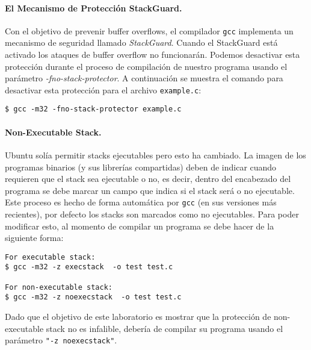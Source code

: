 \paragraph{El Mecanismo de Protección StackGuard.}
Con el objetivo de prevenir buffer overflows, el compilador \texttt{gcc} implementa un mecanismo de seguridad llamado \textit{StackGuard}. Cuando el StackGuard está activado los ataques de buffer overflow no funcionarán. Podemos desactivar esta protección durante el proceso de compilación de nuestro programa usando el parámetro \emph{-fno-stack-protector}.
A continuación se muestra el comando para desactivar esta protección para el archivo \texttt{example.c}:

\begin{lstlisting}
$ gcc -m32 -fno-stack-protector example.c
\end{lstlisting}


\paragraph{Non-Executable Stack.} Ubuntu solía permitir stacks ejecutables pero esto ha cambiado. La imagen de los programas binarios (y sus librerías compartidas) deben de indicar cuando requieren que el stack sea ejecutable o no, es decir, dentro del encabezado del programa se debe marcar un campo que indica si el stack será o no ejecutable. Este proceso es hecho de forma automática por {\tt gcc} (en sus versiones más recientes), por defecto los stacks son marcados como no ejecutables.
Para poder modificar esto, al momento de compilar un programa se debe hacer de la siguiente forma:

\begin{lstlisting}
For executable stack:
$ gcc -m32 -z execstack  -o test test.c

For non-executable stack:
$ gcc -m32 -z noexecstack  -o test test.c
\end{lstlisting}


Dado que el objetivo de este laboratorio es mostrar que la protección de non-executable stack no es infalible, debería de compilar su programa usando el parámetro {\tt "-z noexecstack"}.


